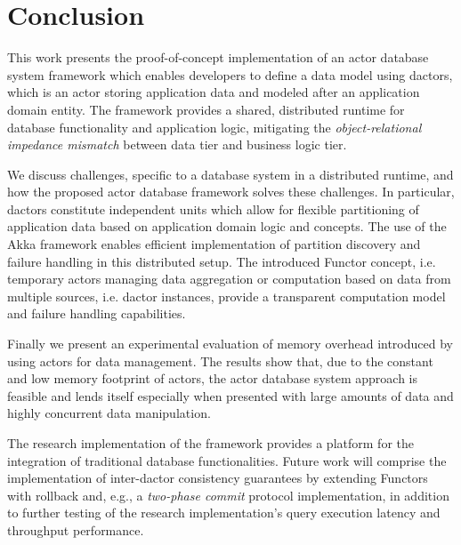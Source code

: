 
\section{Conclusion}\label{sec:conclusion}

This work presents the proof-of-concept implementation of an actor database system framework which enables developers to define a data model using \glspl{dactor}, which is an actor storing application data and modeled after an application domain entity.
The framework provides a shared, distributed runtime for database functionality and application logic, mitigating the \textit{object-relational impedance mismatch} between data tier and business logic tier.

We discuss challenges, specific to a database system in a distributed runtime, and how the proposed actor database framework solves these challenges.
In particular, \glspl{dactor} constitute independent units which allow for flexible partitioning of application data based on application domain logic and concepts.
The use of the Akka framework enables efficient implementation of partition discovery and failure handling in this distributed setup.
The introduced Functor concept, i.e. temporary actors managing data aggregation or computation based on data from multiple sources, i.e. \gls{dactor} instances, provide a transparent computation model and failure handling capabilities.

Finally we present an experimental evaluation of memory overhead introduced by using actors for data management.
The results show that, due to the constant and low memory footprint of actors, the actor database system approach is feasible and lends itself especially when presented with large amounts of data and highly concurrent data manipulation.

The research implementation of the framework provides a platform for the integration of traditional database functionalities.
Future work will comprise the implementation of inter-\gls{dactor} consistency guarantees by extending Functors with rollback and, e.g., a \textit{two-phase commit} protocol implementation,
in addition to further testing of the research implementation's query execution latency and throughput performance.